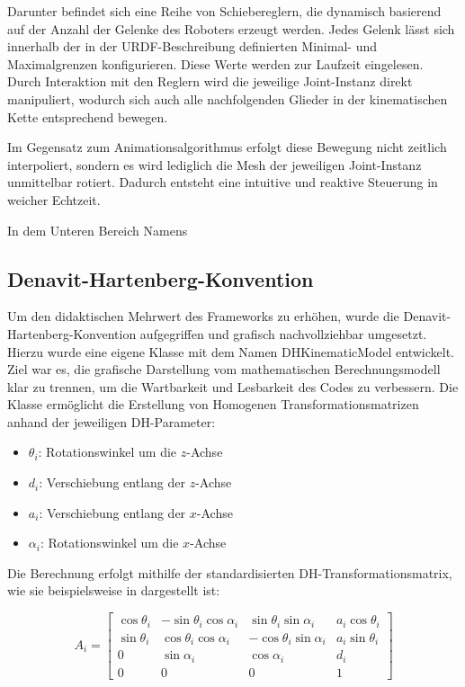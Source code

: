 Darunter befindet sich eine Reihe von Schiebereglern, die dynamisch basierend auf der Anzahl der Gelenke des Roboters erzeugt werden.
Jedes Gelenk lässt sich innerhalb der in der URDF-Beschreibung definierten Minimal- und Maximalgrenzen konfigurieren. Diese Werte werden zur Laufzeit eingelesen.
Durch Interaktion mit den Reglern wird die jeweilige Joint-Instanz direkt manipuliert, wodurch sich auch alle nachfolgenden Glieder in der kinematischen Kette entsprechend bewegen.

Im Gegensatz zum Animationsalgorithmus erfolgt diese Bewegung nicht zeitlich interpoliert, sondern es wird lediglich die Mesh der jeweiligen Joint-Instanz unmittelbar rotiert. Dadurch entsteht eine intuitive und reaktive Steuerung in weicher Echtzeit.

In dem Unteren Bereich Namens



\subsection{Denavit-Hartenberg-Konvention}
Um den didaktischen Mehrwert des Frameworks zu erhöhen, wurde die Denavit-Hartenberg-Konvention aufgegriffen und grafisch nachvollziehbar umgesetzt.
Hierzu wurde eine eigene Klasse mit dem Namen DHKinematicModel entwickelt. Ziel war es, die grafische Darstellung vom mathematischen Berechnungsmodell klar zu trennen,
um die Wartbarkeit und Lesbarkeit des Codes zu verbessern.
Die Klasse ermöglicht die Erstellung von Homogenen Transformationsmatrizen anhand der jeweiligen DH-Parameter:
\begin{itemize}
    \item \( \theta_i \): Rotationswinkel um die \( z \)-Achse
    \item \( d_i \): Verschiebung entlang der \( z \)-Achse
    \item \( a_i \): Verschiebung entlang der \( x \)-Achse
    \item \( \alpha_i \): Rotationswinkel um die \( x \)-Achse
\end{itemize}

Die Berechnung erfolgt mithilfe der standardisierten DH-Transformationsmatrix, wie sie beispielsweise in  dargestellt ist:

\begin{equation}
    A_i =
    \begin{bmatrix}
    \cos\theta_i & -\sin\theta_i\cos\alpha_i & \sin\theta_i\sin\alpha_i & a_i\cos\theta_i \\
    \sin\theta_i & \cos\theta_i\cos\alpha_i  & -\cos\theta_i\sin\alpha_i & a_i\sin\theta_i \\
    0            & \sin\alpha_i              & \cos\alpha_i              & d_i \\
    0            & 0                         & 0                         & 1
    \end{bmatrix}
\end{equation}


